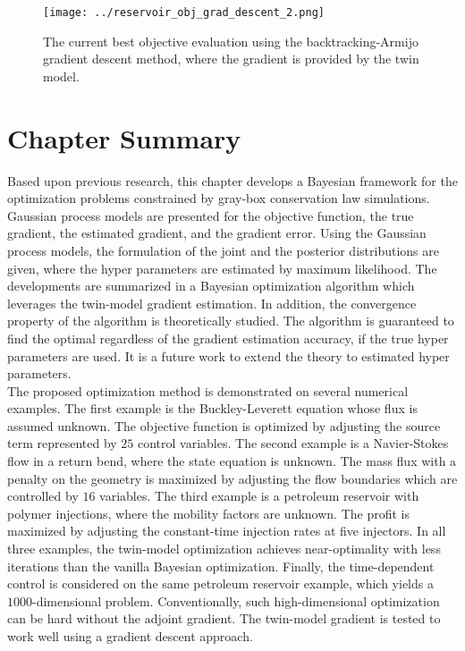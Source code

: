 \begin{figure}[htbp]\begin{center}
    \texttt{[image: ../reservoir\_obj\_grad\_descent\_2.png]}
    \caption{The current best objective evaluation using the backtracking-Armijo gradient
             descent method, where the gradient is provided by the twin model.}
    \label{fig: chap 3 reservoir grad descent obj}
\end{center}\end{figure}


\section{Chapter Summary}
Based upon previous research, this chapter develops a Bayesian framework
for the optimization problems constrained by gray-box conservation law simulations.
Gaussian process models are presented for the objective function, the true gradient,
the estimated gradient, and the gradient error.
Using the Gaussian process models, the formulation of the joint and the
posterior distributions are given,
where the hyper parameters are estimated by maximum likelihood.
The developments are summarized in a Bayesian optimization algorithm 
which leverages the twin-model gradient estimation.
In addition, the convergence property of the algorithm is theoretically 
studied. The algorithm is guaranteed to find the optimal regardless
of the gradient estimation accuracy, if the true hyper parameters are used.
It is a future work to extend the theory to estimated hyper parameters.\\

The proposed optimization method is demonstrated on several numerical examples.
The first example is the Buckley-Leverett equation whose flux is assumed unknown.
The objective function is optimized by adjusting the source term represented by $25$ control variables.
The second example is a Navier-Stokes flow in a return bend, where the state
equation is unknown. The mass flux 
with a penalty on the geometry is maximized by adjusting the flow boundaries
which are controlled by $16$ variables. The third example is a petroleum reservoir
with polymer injections, where the mobility factors are unknown. 
The profit is maximized by adjusting the constant-time 
injection rates at five injectors. In all three examples, the
twin-model optimization achieves
near-optimality with less iterations than the vanilla Bayesian optimization. 
Finally, the time-dependent control is considered on the same petroleum reservoir example,
which yields a $1000$-dimensional problem. Conventionally, 
such high-dimensional optimization can be hard without the adjoint gradient. 
The twin-model gradient is tested to work well using a gradient descent approach.\\

